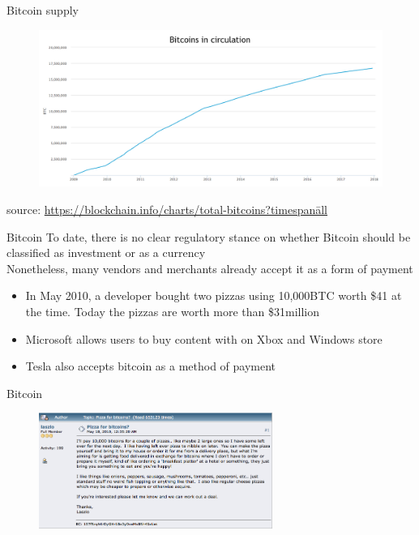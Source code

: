 \documentclass[11pt]{beamer}
\begin{document}

\begin{frame}{Bitcoin supply}
	\begin{figure}[]
		\centering
		\includegraphics  [scale=0.2]{Images/btc-circulation}
	\end{figure}
		\begin{scriptsize}
		source: \href{https://blockchain.info/charts/total-bitcoins?timespan=all}{https://blockchain.info/charts/total-bitcoins?timespan\=all}
	\end{scriptsize}
\end{frame}


\begin{frame}{Bitcoin}
	To date, there is no clear regulatory stance on whether Bitcoin should be classified as investment or as a currency \\ \vspace{3mm}
	Nonetheless, many vendors and merchants already accept it as a form of payment
	\begin{itemize}
		\item In May 2010, a developer bought two pizzas using 10,000BTC worth \$41 at the time. Today the pizzas are worth more than \$31million
		\item Microsoft allows users to buy content with on Xbox and Windows store
		\item Tesla also accepts bitcoin as a method of payment
	\end{itemize}
\end{frame}


\begin{frame}{Bitcoin}
	\begin{figure}[]
		\centering
		\includegraphics  [width=3in]{Images/pizza1}
	\end{figure}
\end{frame}
\end{document}
